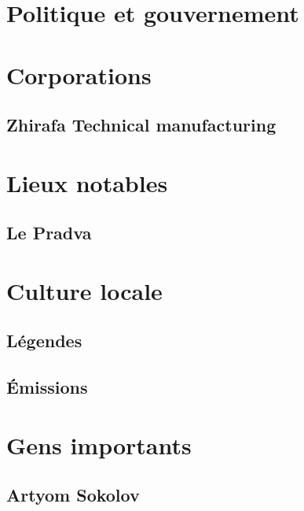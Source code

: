 \documentclass[10pt,a4paper]{book}
\begin{document}
\chapter{Politique et gouvernement}
\chapter{Corporations}
\section{Zhirafa Technical manufacturing}
\chapter{Lieux notables}
\section{Le Pradva}
\chapter{Culture locale}
\section{Légendes}
\section{Émissions}
\chapter{Gens importants}
\section{Artyom Sokolov}
\end{document}
